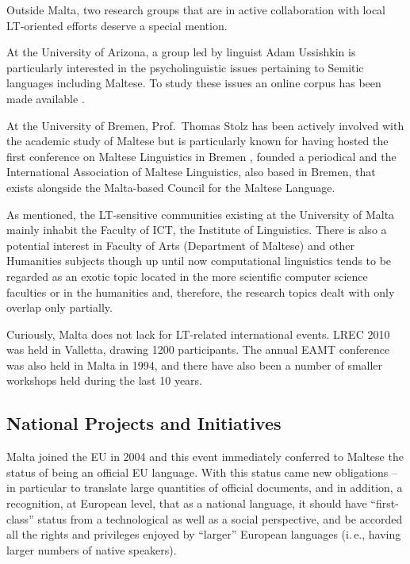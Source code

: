 \begin{multicols}{2}
Outside Malta, two research groups that are in active collaboration with local LT-oriented efforts deserve a special mention.

At the University of Arizona, a group led by linguist Adam Ussishkin is particularly interested in the psycholinguistic issues pertaining to Semitic languages including Maltese. To study these issues an online corpus has been made available \cite{Ussishkin-et-al:2009}. 

At the University of Bremen, Prof.~Thomas Stolz has been actively involved with the academic study of Maltese but is particularly known for having hosted the first conference on Maltese Linguistics in Bremen \cite{Comrie-et-al:2009}, founded a periodical \cite{GHILM2} and the International Association of Maltese Linguistics, also based in Bremen, that exists alongside the Malta-based Council for the Maltese Language.

As mentioned, the LT-sensitive communities existing at the University of Malta mainly inhabit the Faculty of ICT, the Institute of Linguistics. There is also a potential interest in Faculty of Arts (Department of Maltese) and other Humanities subjects though up until now computational linguistics tends to be regarded as an exotic topic located in the more scientific computer science faculties or in the humanities and, therefore, the research topics dealt with only overlap only partially.

Curiously, Malta does not lack for LT-related international events. LREC 2010 was held in Valletta, drawing 1200 participants. The annual EAMT conference was also held in Malta in 1994, and there have also been a number of smaller workshops held during the last 10 years.

\subsection{National Projects and Initiatives}

Malta joined the EU in 2004 and this event immediately conferred to Maltese the status of being an official EU language. With this status came new obligations -- in particular to translate large quantities of official documents, and in addition, a recognition, at European level, that as a national language, it should have ``first-class'' status from a technological as well as a social perspective, and be accorded all the rights and privileges enjoyed by ``larger'' European languages (i.\,e., having larger numbers of native speakers). 


\end{multicols}
